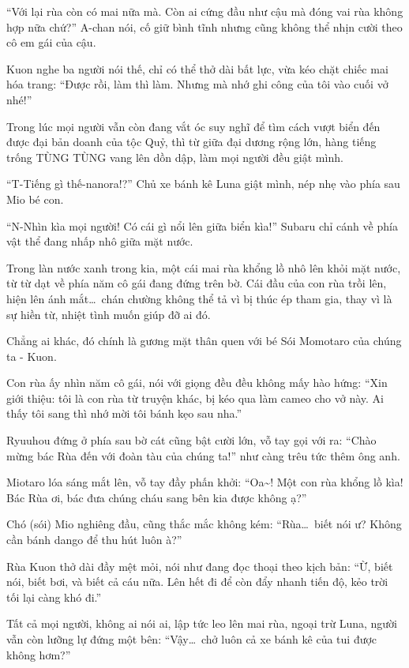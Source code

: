 \documentclass[../main.tex]{subfiles}
\begin{document}
``Với lại rùa còn có mai nữa mà. Còn ai cứng đầu như cậu mà đóng vai rùa không hợp nữa chứ?'' A-chan nói, cố giữ bình tĩnh nhưng cũng không thể nhịn cười theo cô em gái của cậu.

Kuon nghe ba người nói thế, chỉ có thể thở dài bất lực, vừa kéo chặt chiếc mai hóa trang: ``Được rồi, làm thì làm. Nhưng mà nhớ ghi công của tôi vào cuối vở nhé!''

\il

Trong lúc mọi người vẫn còn đang vắt óc suy nghĩ để tìm cách vượt biển đến được đại bản doanh của tộc Quỷ, thì từ giữa đại dương rộng lớn, hàng tiếng trống TÙNG TÙNG vang lên dồn dập, làm mọi người đều giật mình.

``T-Tiếng gì thế-nanora!?'' Chủ xe bánh kê Luna giật mình, nép nhẹ vào phía sau Mio bé con.

``N-Nhìn kìa mọi người! Có cái gì nổi lên giữa biển kìa!'' Subaru chỉ cánh về phía vật thể đang nhấp nhô giữa mặt nước.

Trong làn nước xanh trong kia, một cái mai rùa khổng lồ nhô lên khỏi mặt nước, từ từ dạt về phía năm cô gái đang đứng trên bờ. Cái đầu của con rùa trồi lên, hiện lên ánh mắt\dots\ chán chường không thể tả vì bị thúc ép tham gia, thay vì là sự hiền từ, nhiệt tình muốn giúp đỡ ai đó.

Chẳng ai khác, đó chính là gương mặt thân quen với bé Sói Momotaro của chúng ta - Kuon.

Con rùa ấy nhìn năm cô gái, nói với giọng đều đều không mấy hào hứng: ``Xin giới thiệu: tôi là con rùa từ truyện khác, bị kéo qua làm cameo cho vở này. Ai thấy tôi sang thì nhớ mời tôi bánh kẹo sau nha.''

Ryuuhou đứng ở phía sau bờ cát cũng bật cười lớn, vỗ tay gọi với ra: ``Chào mừng bác Rùa đến với đoàn tàu của chúng ta!'' như càng trêu tức thêm ông anh.

Miotaro lóa sáng mắt lên, vỗ tay đầy phấn khởi: ``Oa\~{}! Một con rùa khổng lồ kìa! Bác Rùa ơi, bác đưa chúng cháu sang bên kia được không ạ?''

Chó (sói) Mio nghiêng đầu, cũng thắc mắc không kém: ``Rùa\dots\ biết nói ư? Không cần bánh dango để thu hút luôn à?''

Rùa Kuon thở dài đầy mệt mỏi, nói như đang đọc thoại theo kịch bản: ``Ừ, biết nói, biết bơi, và biết cả cáu nữa. Lên hết đi để còn đẩy nhanh tiến độ, kẻo trời tối lại càng khó đi.''

Tất cả mọi người, không ai nói ai, lập tức leo lên mai rùa, ngoại trừ Luna, người vẫn còn lưỡng lự đứng một bên: ``Vậy\dots\ chở luôn cả xe bánh kê của tui được không hơm?''
\end{document}
